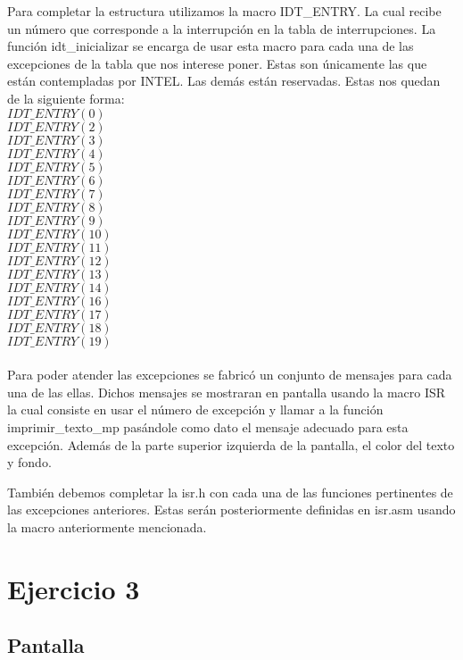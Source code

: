 \documentclass[a4paper]{article}
\begin{document}
Para completar la estructura utilizamos la macro IDT\_ENTRY. La cual recibe un número que corresponde a la interrupción en la tabla de interrupciones. La función idt\_inicializar se encarga de usar esta macro para cada una de las excepciones de la tabla que nos interese poner. Estas son únicamente las que están contempladas por INTEL. Las demás están reservadas. Estas nos quedan de la siguiente forma:
\\
    $IDT\_ENTRY(0)$\\
    $IDT\_ENTRY(2)$\\
    $IDT\_ENTRY(3)$\\
    $IDT\_ENTRY(4)$\\
    $IDT\_ENTRY(5)$\\
    $IDT\_ENTRY(6)$\\
    $IDT\_ENTRY(7)$\\
    $IDT\_ENTRY(8)$\\
    $IDT\_ENTRY(9)$\\
    $IDT\_ENTRY(10)$\\
    $IDT\_ENTRY(11)$\\
    $IDT\_ENTRY(12)$\\
    $IDT\_ENTRY(13)$\\
    $IDT\_ENTRY(14)$\\
    $IDT\_ENTRY(16)$\\
    $IDT\_ENTRY(17)$\\
    $IDT\_ENTRY(18)$\\
    $IDT\_ENTRY(19)$\\
\\

Para poder atender las excepciones se fabricó un conjunto de mensajes para cada una de las ellas. Dichos mensajes se mostraran en pantalla usando la macro ISR la cual consiste en usar el número de excepción y llamar a la función imprimir\_texto\_mp pasándole como dato el mensaje adecuado para esta excepción. Además de la parte superior izquierda de la pantalla, el color del texto y fondo. 

También debemos completar la isr.h con cada una de las funciones pertinentes de las excepciones anteriores. Estas serán posteriormente definidas en isr.asm usando la macro anteriormente mencionada.

\section{Ejercicio 3}

\subsection{Pantalla}
\end{document}
